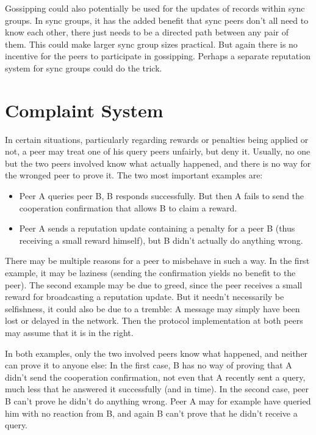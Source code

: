 Gossipping could also potentially be used for the updates of records within sync
groups. In sync groups, it has the added benefit that sync peers don't all need
to know each other, there just needs to be a directed path between any pair of
them. This could make larger sync group sizes practical. But again there is no
incentive for the peers to participate in gossipping. Perhaps a separate
reputation system for sync groups could do the trick.

\section{Complaint System}
\label{sec:desc_complaints}
In certain situations, particularly regarding rewards or penalties being applied
or not, a peer may treat one of his query peers unfairly, but deny it. Usually,
no one but the two peers involved know what actually happened, and there is no
way for the wronged peer to prove it. The two most important examples are:
\begin{itemize}
\item Peer A queries peer B, B responds successfully. But then A fails to send
      the cooperation confirmation that allows B to claim a reward.
\item Peer A sends a reputation update containing a penalty for a peer B (thus
      receiving a small reward himself), but B didn't actually do anything
      wrong.
\end{itemize}

There may be multiple reasons for a peer to misbehave in such a way. In the
first example, it may be laziness (sending the confirmation yields no benefit to
the peer). The second example may be due to greed, since the peer receives a
small reward for broadcasting a reputation update. But it needn't necessarily be
selfishness, it could also be due to a tremble: A message may simply have been
lost or delayed in the network. Then the protocol implementation at both peers
may assume that it is in the right.

In both examples, only the two involved peers know what happened, and neither
can prove it to anyone else: In the first case, B has no way of proving that A
didn't send the cooperation confirmation, not even that A recently sent a query,
much less that he answered it successfully (and in time). In the second case,
peer B can't prove he didn't do anything wrong. Peer A may for example have
queried him with no reaction from B, and again B can't prove that he didn't
receive a query.

